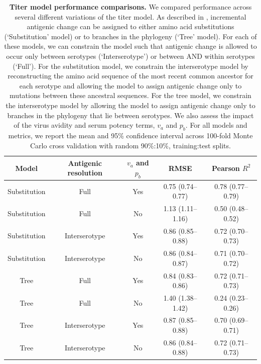 \documentclass[11pt,oneside,letterpaper]{article}
\begin{document}
\begin{table}[ht]
  \centering
  \caption{
    \textbf{Titer model performance comparisons.}
    We compared performance across several different variations of the titer model.
    As described in \citet{neher2016prediction}, incremental antigenic change can be assigned to either amino acid substitutions (`Substitution' model) or to branches in the phylogeny (`Tree' model).
    For each of these models, we can constrain the model such that antigenic change is allowed to occur only between serotypes (`Interserotype') or between AND within serotypes (`Full').
    For the substitution model, we constrain the interserotype model by reconstructing the amino acid sequence of the most recent common ancestor for each serotype and allowing the model to assign antigenic change only to mutations between these ancestral sequences.
    For the tree model, we constrain the interserotype model by allowing the model to assign antigenic change only to branches in the phylogeny that lie between serotypes.
    We also assess the impact of the virus avidity and serum potency terms, $v_a$ and $p_b$.
    For all models and metrics, we report the mean and 95\% confidence interval across 100-fold Monte Carlo cross validation with random 90\%:10\%, training:test splits.
  }
  \label{titer_model_performance}
  \begin{tabular}[ht]{ c c c c c }
    Model         & Antigenic resolution  & $v_a$ and $p_b$ & RMSE              & Pearson $R^2$ \\
    \hline
    Substitution  & Full             & Yes             & 0.75 (0.74--0.77) & 0.78 (0.77--0.79) \\
    Substitution  & Full             & No              & 1.13 (1.11--1.16) & 0.50 (0.48--0.52) \\
    Substitution  & Interserotype         & Yes             & 0.86 (0.85--0.88) & 0.72 (0.70--0.73) \\
    Substitution  & Interserotype         & No              & 0.86 (0.84--0.87) & 0.71 (0.70--0.72) \\
    Tree          & Full             & Yes             & 0.84 (0.83--0.86) & 0.72 (0.71--0.73) \\
    Tree          & Full             & No              & 1.40 (1.38--1.42) & 0.24 (0.23--0.26) \\
    Tree          & Interserotype         & Yes             & 0.87 (0.85--0.88) & 0.70 (0.69--0.71) \\
    Tree          & Interserotype         & No              & 0.86 (0.84--0.88) & 0.72 (0.71--0.73) \\
    \hline
  \end{tabular}
\end{table}
\end{document}
